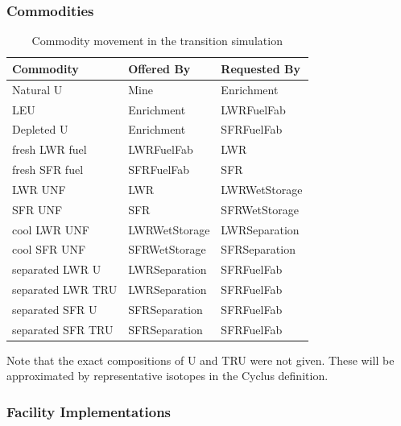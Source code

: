 \subsubsection{Commodities}

\begin{table}[htbp]
\centering
\begin{tabular}{|l|l|l|}
\hline
Commodity  &     Offered By  &    Requested By \\
\hline
Natural  U & Mine & Enrichment \\ 
LEU & Enrichment & LWRFuelFab \\ 
Depleted U & Enrichment & SFRFuelFab \\ 
fresh LWR fuel & LWRFuelFab & LWR \\ 
fresh SFR fuel & SFRFuelFab & SFR \\ 
LWR UNF & LWR & LWRWetStorage \\ 
SFR UNF & SFR & SFRWetStorage \\ 
cool LWR UNF & LWRWetStorage & LWRSeparation \\ 
cool SFR UNF & SFRWetStorage & SFRSeparation \\ 
separated LWR U & LWRSeparation & SFRFuelFab \\ 
separated LWR TRU & LWRSeparation & SFRFuelFab \\ 
separated SFR U & SFRSeparation & SFRFuelFab \\ 
separated SFR TRU & SFRSeparation & SFRFuelFab \\ 
\hline
\end{tabular}
\caption{Commodity movement in the transition simulation}
\label{tab:commods}
\end{table}

Note that the exact compositions of U and TRU were not given. These will be
approximated by representative isotopes in the Cyclus definition.


\subsubsection{Facility Implementations}

